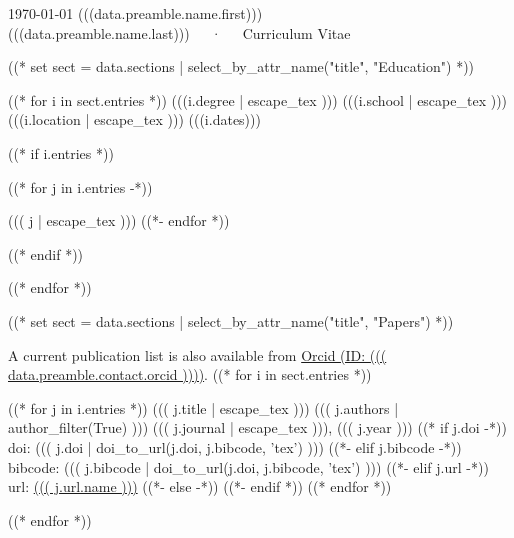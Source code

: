 \documentclass[10pt, letterpaper]{awesome-cv}
\begin{document}
\makecvheader

\makecvfooter
  {\today}
  {(((data.preamble.name.first))) (((data.preamble.name.last)))~~~·~~~Curriculum Vitae}
  {\thepage}



((* set sect = data.sections | select_by_attr_name("title", "Education") *))
\begin{cventries}
((* for i in sect.entries *))
\cventry
  {(((i.degree | escape_tex )))}
  {(((i.school | escape_tex )))}
  {(((i.location | escape_tex )))}
  {(((i.dates)))}
  {((* if i.entries *))
    \begin{cvitems}
    ((* for j in i.entries -*))
    \item ((( j | escape_tex )))
    ((*- endfor *))
    \end{cvitems}
    ((* endif *))}
((* endfor *))
\end{cventries}

((* set  sect = data.sections | select_by_attr_name("title", "Papers") *))

A current publication list is also available from 
\href{https://orcid.org/((( data.preamble.contact.orcid )))}
     {Orcid (ID: ((( data.preamble.contact.orcid ))))}.
((* for i in sect.entries *))
\begin{cventries}
((* for j in i.entries *))
\cventry
  {((( j.title | escape_tex )))}
  {((( j.authors | author_filter(True) )))}
  {((( j.journal | escape_tex ))), ((( j.year )))}
  ((* if j.doi -*))
  {doi: ((( j.doi | doi_to_url(j.doi, j.bibcode, 'tex') )))}
  ((*- elif j.bibcode -*))
  {bibcode: ((( j.bibcode | doi_to_url(j.doi, j.bibcode, 'tex') )))}
  ((*- elif j.url -*))
  {url: \href{((( j.url.link )))}{((( j.url.name )))}}
  ((*- else -*))
  {}
  ((*- endif *))
  {}
((* endfor *))
\end{cventries}
((* endfor *))
\end{document}
